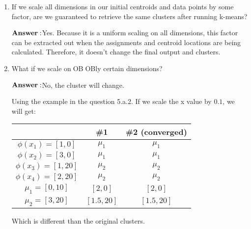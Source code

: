 \documentclass[12pt]{article}
\begin{document}
\begin{enumerate}[label=\arabic*.]
\item
If we scale all dimensions in our initial centroids and data points by some factor, are we guaranteed to retrieve the same clusters after running k-means?

\(\bold{Answer:}\)Yes. Because it is a uniform scaling on all dimensions, this factor can be extracted out when the assignments and centroid locations are being calculated. Therefore, it doesn't change the final output and clusters.

\item
What if we scale onOBOBly certain dimensions?

\(\bold{Answer:}\)No, the cluster will change.

Using the example in the question 5.a.2. If we scale the x value by \(0.1\), we will get:

\begin{tabular}{ |c|c|c| }
 \hline
    & \#1 & \#2 (converged) \\
  \hline
\(\phi(x_1) = [1, 0]\) & \(\mu_1\) & \(\mu_1\) \\
\(\phi(x_2)= [3, 0]\) & \(\mu_1\) & \(\mu_1\) \\
\(\phi(x_3)= [1, 20]\) & \(\mu_2\) & \(\mu_2\) \\
\(\phi(x_4)= [2, 20]\) & \(\mu_2\) & \(\mu_2\) \\
 \hline
\(\mu_1= [0, 10]\) & \([2, 0]\) & \([2, 0]\) \\
\(\mu_2= [3, 20]\) & \([1.5, 20]\)& \([1.5, 20]\) \\
 \hline
\end{tabular}

Which is different than the original clusters.


\end{enumerate}
\end{document}
